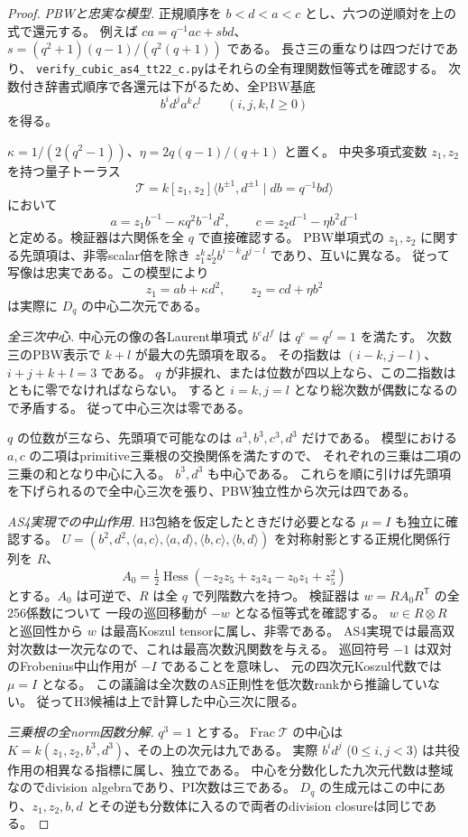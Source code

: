 \begin{proof}
\emph{PBWと忠実な模型.}
正規順序を $b<d<a<c$ とし、六つの逆順対を上の式で還元する。
例えば $ca=q^{-1}ac+sbd$、
$s=(q^2+1)(q-1)/(q^2(q+1))$ である。
長さ三の重なりは四つだけであり、
\texttt{verify\_cubic\_as4\_tt22\_c.py}はそれらの全有理関数恒等式を確認する。
次数付き辞書式順序で各還元は下がるため、全PBW基底
\[
 b^i d^j a^k c^l\qquad(i,j,k,l\ge0)
\]
を得る。

$\kappa=1/(2(q^2-1))$、$\eta=2q(q-1)/(q+1)$ と置く。
中央多項式変数 $z_1,z_2$ を持つ量子トーラス
\[
 \mathcal T=k[z_1,z_2]\langle b^{\pm1},d^{\pm1}\mid db=q^{-1}bd\rangle
\]
において
\[
 a=z_1b^{-1}-\kappa q^2b^{-1}d^2,\qquad
 c=z_2d^{-1}-\eta b^2d^{-1}
\]
と定める。検証器は六関係を全 $q$ で直接確認する。
PBW単項式の $z_1,z_2$ に関する先頭項は、非零scalar倍を除き
$z_1^kz_2^l b^{i-k}d^{j-l}$ であり、互いに異なる。
従って写像は忠実である。この模型により
\[
 z_1=ab+\kappa d^2,\qquad z_2=cd+\eta b^2
\]
は実際に $D_q$ の中心二次元である。

\emph{全三次中心.}
中心元の像の各Laurent単項式 $b^e d^f$ は $q^e=q^f=1$ を満たす。
次数三のPBW表示で $k+l$ が最大の先頭項を取る。
その指数は $(i-k,j-l)$、$i+j+k+l=3$ である。
$q$ が非捩れ、または位数が四以上なら、この二指数はともに零でなければならない。
すると $i=k,j=l$ となり総次数が偶数になるので矛盾する。
従って中心三次は零である。

$q$ の位数が三なら、先頭項で可能なのは $a^3,b^3,c^3,d^3$ だけである。
模型における $a,c$ の二項はprimitive三乗根の交換関係を満たすので、
それぞれの三乗は二項の三乗の和となり中心に入る。
$b^3,d^3$ も中心である。
これらを順に引けば先頭項を下げられるので全中心三次を張り、PBW独立性から次元は四である。

\emph{AS4実現での中山作用.}
H3包絡を仮定したときだけ必要となる $\mu=I$ も独立に確認する。
$U=(b^2,d^2,\langle a,c\rangle,\langle a,d\rangle,\langle b,c\rangle,\langle b,d\rangle)$
を対称射影とする正規化関係行列を $R$、
\[
 A_0=\tfrac12\operatorname{Hess}(-z_2z_5+z_3z_4-z_0z_1+z_5^2)
\]
とする。$A_0$ は可逆で、$R$ は全 $q$ で列階数六を持つ。
検証器は $w=RA_0R^{\mathsf T}$ の全256係数について
一段の巡回移動が $-w$ となる恒等式を確認する。
$w\in R\otimes R$ と巡回性から $w$ は最高Koszul tensorに属し、非零である。
AS4実現では最高双対次数は一次元なので、これは最高次数汎関数を与える。
巡回符号 $-1$ は双対のFrobenius中山作用が $-I$ であることを意味し、
元の四次元Koszul代数では $\mu=I$ となる。
この議論は全次数のAS正則性を低次数rankから推論していない。
従ってH3候補は上で計算した中心三次に限る。

\emph{三乗根の全norm因数分解.}
$q^3=1$ とする。$\operatorname{Frac}\mathcal T$ の中心は
$K=k(z_1,z_2,b^3,d^3)$、その上の次元は九である。
実際 $b^i d^j$ ($0\le i,j<3$) は共役作用の相異なる指標に属し、独立である。
中心を分数化した九次元代数は整域なのでdivision algebraであり、PI次数は三である。
$D_q$ の生成元はこの中にあり、$z_1,z_2,b,d$ とその逆も分数体に入るので両者のdivision closureは同じである。


\end{proof}

